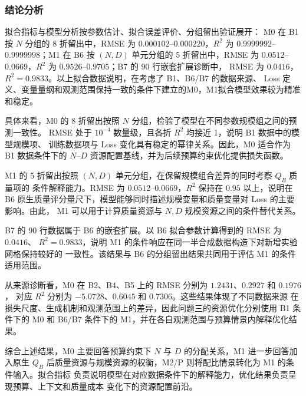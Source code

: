 \subsubsection{结论分析}
拟合指标与模型分析按参数估计、拟合误差评价、分组留出验证展开：
M0 在 B1 按 $N$ 分组的 8 折留出中，RMSE 为 $0.000102$--$0.000220$，$R^2$ 为
$0.9999992$--$0.9999998$；M1 在 B6 按 $(N,D)$ 单元分组的 5 折留出中，RMSE 为
$0.0512$--$0.0669$，$R^2$ 为 $0.9526$--$0.9705$；B7 的 90 行嵌套扩展诊断中，
RMSE 为 $0.0416$，$R^2=0.9833$。以上拟合数据说明，在考虑了 B1、B6/B7 的数据来源、
Loss 定义、变量量纲和观测范围保持一致的条件下建立的M0，M1拟合模型效果较为精准和稳定。

具体来看，M0 的 8 折留出按照 $N$ 分组，检验了模型在不同参数规模组之间的预测一致性。
RMSE 处于 $10^{-4}$ 数量级，且各折 $R^2$ 均接近 1，说明 B1 数据中的模型规模项、
训练数据项与 Loss 变化具有稳定的幂律关系。因此，M0 适合作为 B1 数据条件下的
$N$--$D$ 资源配置基线，并为后续预算约束优化提供损失函数。

M1 的 5 折留出按照 $(N,D)$ 单元分组，在保留规模组合差异的同时考察 $Q_B$ 质量项的
条件解释能力。RMSE 为 $0.0512$--$0.0669$，$R^2$ 保持在 $0.95$ 以上，说明在 B6
原生质量评分量尺下，模型能够同时描述规模变量和质量变量对 Loss 的主要影响。由此，
M1 可以用于计算质量资源与 $N,D$ 规模资源之间的条件替代关系。

B7 的 90 行数据属于 B6 的嵌套扩展。以 B6 拟合参数计算得到的 RMSE 为 $0.0416$、
$R^2=0.9833$，说明 M1 的条件响应在同一半合成数据构造下对新增实验网格保持较好的
一致性。该结果与 B6 的分组留出结果共同用于评估 M1 的条件适用范围。

从来源诊断看，M0 在 B2、B4、B5 上的 RMSE 分别为 $1.2431$、$0.2927$ 和 $0.1976$，
对应 $R^2$ 分别为 $-5.0728$、$0.6045$ 和 $0.7306$。这些结果体现了不同数据来源
在损失尺度、生成机制和观测范围上的差异，因此问题三的资源优化分别使用 B1 条件下的
M0 和 B6/B7 条件下的 M1，并在各自观测范围与预算情景内解释优化结果。

综合上述结果，M0 主要回答预算约束下 $N$ 与 $D$ 的分配关系，M1 进一步回答加入原生
$Q_B$ 后质量资源与规模资源的权衡，M2/P 则将配比情景转化为 M1 的条件输入。拟合指标
负责说明模型在对应数据条件下的解释能力，优化结果负责呈现预算、上下文和质量成本
变化下的资源配置前沿。
